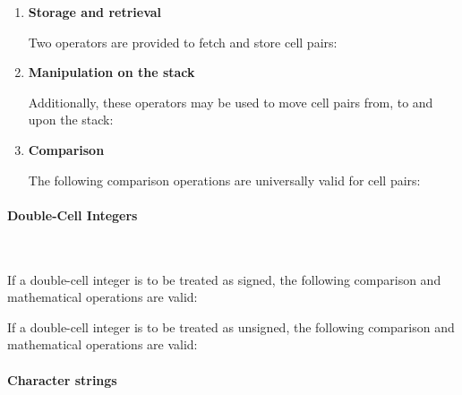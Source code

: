 \begin{enumerate}
\item \textbf{Storage and retrieval}

	Two operators are provided to fetch and store cell pairs:
	\begin{quote}\ttfamily
			
	\end{quote}

\item \textbf{Manipulation on the stack}

	Additionally, these operators may be used to move cell pairs
	from, to and upon the stack:
	\begin{quote}\ttfamily
					
				
	\end{quote}

\item \textbf{Comparison}

	The following comparison operations are universally valid for
	cell pairs:
	\begin{quote}\ttfamily
			
	\end{quote}
\end{enumerate}


\paragraph{Double-Cell Integers} ~ %

If a double-cell integer is to be treated as signed, the following
comparison and mathematical operations are valid:
\begin{quote}\ttfamily
					
				
			
			
\end{quote}
If a double-cell integer is to be treated as unsigned, the following
comparison and mathematical operations are valid:
\begin{quote}\ttfamily
		
			
\end{quote}


\paragraph{Character strings} ~ %

